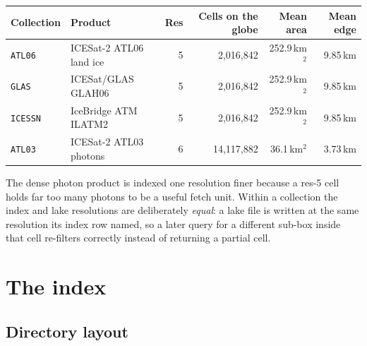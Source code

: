 \documentclass[11pt,a4paper]{article}
\newcommand{\code}[1]{\texttt{\small #1}}
\begin{document}
\begin{center}
\end{center}

\begin{center}\small
\begin{tabular}{@{}llrrrr@{}}
\toprule
\textbf{Collection} & \textbf{Product} & \textbf{Res} & \textbf{Cells on the globe} & \textbf{Mean area} & \textbf{Mean edge} \\
\midrule
\code{ATL06}   & ICESat-2 ATL06 land ice & 5 & 2{,}016{,}842  & 252.9\,km$^2$ & 9.85\,km \\
\code{GLAS}    & ICESat/GLAS GLAH06      & 5 & 2{,}016{,}842  & 252.9\,km$^2$ & 9.85\,km \\
\code{ICESSN}  & IceBridge ATM ILATM2    & 5 & 2{,}016{,}842  & 252.9\,km$^2$ & 9.85\,km \\
\code{ATL03}   & ICESat-2 ATL03 photons  & 6 & 14{,}117{,}882 & 36.1\,km$^2$  & 3.73\,km \\
\bottomrule
\end{tabular}
\end{center}

\noindent
The dense photon product is indexed one resolution finer because a res-5 cell holds far too many photons to
be a useful fetch unit. Within a collection the index and lake resolutions are deliberately \emph{equal}: a
lake file is written at the same resolution its index row named, so a later query for a different sub-box
inside that cell re-filters correctly instead of returning a partial cell.

\section{The index}

\subsection{Directory layout}
\end{document}
